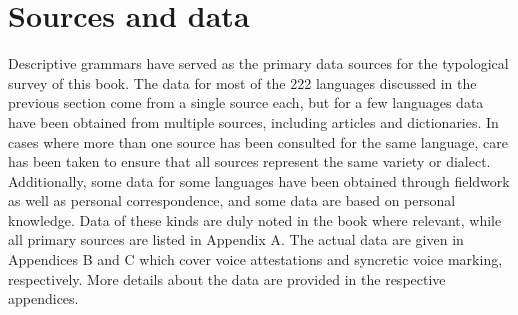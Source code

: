 \section{Sources and data} \label{sources}
Descriptive grammars have served as the primary data sources for the typological survey of this book. The data for most of the 222 languages discussed in the previous section come from a single source each, but for a few languages data have been obtained from multiple sources, including articles and dictionaries. In cases where more than one source has been consulted for the same language, care has been taken to ensure that all sources represent the same variety or dialect. Additionally, some data for some languages have been obtained through fieldwork as well as personal correspondence, and some data are based on personal knowledge. Data of these kinds are duly noted in the book where relevant, while all primary sources are listed in Appendix A. The actual data are given in Appendices B and C which cover voice attestations and syncretic voice marking, respectively. More details about the data are provided in the respective appendices.
